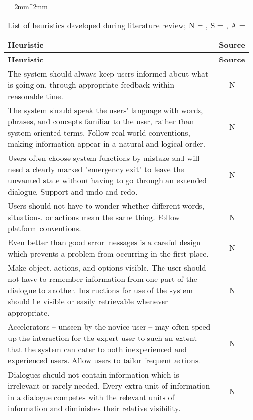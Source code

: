 \begin{singlespace}
		\tabulinesep=_2mm^2mm
	\begin{longtabu} to \textwidth {X[1, p] c}
			\caption[List of heuristics developed during literature review]{List of heuristics developed during literature review; N = \citet{Nielsen1994a}, S = \citet{Singh2009}, A = \citet{Ardito2006}}\\
			\toprule
			\textbf{Heuristic} & \textbf{Source} \\
			\midrule
		\endfirsthead
			
			\textbf{Heuristic} & \textbf{Source} \\
			\midrule
		\endhead
		
			\bottomrule
		\endlastfoot
		
		The system should always keep users informed about what is going on, through appropriate feedback within reasonable time. & N \\
		The system should speak the users' language with words, phrases, and concepts familiar to the user, rather than system-oriented terms. Follow real-world conventions, making information appear in a natural and logical order. & N \\
		Users often choose system functions by mistake and will need a clearly marked "emergency exit" to leave the unwanted state without having to go through an extended dialogue. Support and undo and redo. & N \\
		Users should not have to wonder whether different words, situations, or actions mean the same thing. Follow platform conventions. & N \\
		Even better than good error messages is a careful design which prevents a problem from occurring in the first place. & N \\
		Make object, actions, and options visible. The user should not have to remember information from one part of the dialogue to another. Instructions for use of the system should be visible or easily retrievable whenever appropriate. & N \\
		Accelerators -- unseen by the novice user -- may often speed up the interaction for the expert user to such an extent that the system can cater to both inexperienced and experienced users. Allow users to tailor frequent actions. & N \\
		Dialogues should not contain information which is irrelevant or rarely needed. Every extra unit of information in a dialogue competes with the relevant units of information and diminishes their relative visibility. & N \\

\end{longtabu}
\end{singlespace}
